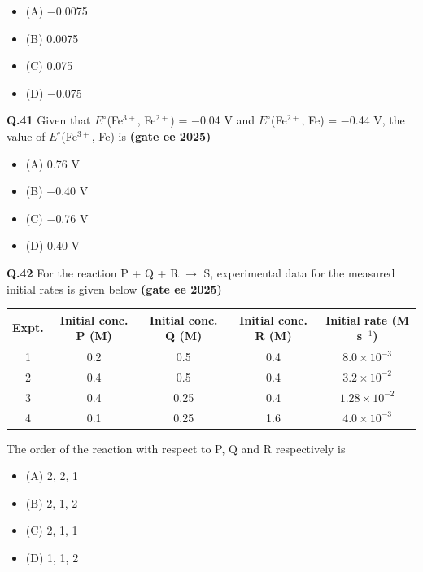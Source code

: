 \documentclass[journal,12pt,onecolumn]{exam}
\theoremstyle{remark}
\begin{document}
\begin{multicols}{2}
\begin{itemize}[label={}, leftmargin=*, itemsep=0pt]
\item (A) $-$0.0075
\item (B) 0.0075
\item (C) 0.075
\item (D) $-$0.075
\end{itemize}
\end{multicols}
\vspace{0.5cm}

\noindent \textbf{Q.41} Given that $E^\circ$(Fe$^{3+}$, Fe$^{2+}$) = $-$0.04 V and $E^\circ$(Fe$^{2+}$, Fe) = $-$0.44 V, the value of $E^\circ$(Fe$^{3+}$, Fe) is \hfill{\textbf{(gate ee 2025)}}

\begin{multicols}{2}
\begin{itemize}[label={}, leftmargin=*, itemsep=0pt]
\item (A) 0.76 V
\item (B) $-$0.40 V
\item (C) $-$0.76 V
\item (D) 0.40 V
\end{itemize}
\end{multicols}
\vspace{0.5cm}

\noindent \textbf{Q.42} For the reaction P + Q + R $\rightarrow$ S, experimental data for the measured initial rates is given below \hfill{\textbf{(gate ee 2025)}}

\begin{center}
\begin{tabular}{|c|c|c|c|c|}
\hline
Expt. & Initial conc. P (M) & Initial conc. Q (M) & Initial conc. R (M) & Initial rate (M s$^{-1}$) \\
\hline
1 & 0.2 & 0.5 & 0.4 & $8.0 \times 10^{-3}$ \\
2 & 0.4 & 0.5 & 0.4 & $3.2 \times 10^{-2}$ \\
3 & 0.4 & 0.25 & 0.4 & $1.28 \times 10^{-2}$ \\
4 & 0.1 & 0.25 & 1.6 & $4.0 \times 10^{-3}$ \\
\hline
\end{tabular}
\end{center}

The order of the reaction with respect to P, Q and R respectively is

\begin{multicols}{2}
\begin{itemize}[label={}, leftmargin=*, itemsep=0pt]
\item (A) 2, 2, 1
\item (B) 2, 1, 2
\item (C) 2, 1, 1
\item (D) 1, 1, 2
\end{itemize}
\end{multicols}
\vspace{0.5cm}
\end{document}
